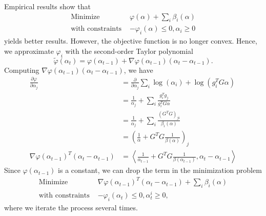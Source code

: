 \documentclass{article}
\renewcommand{\|}{\biggr|}
\begin{document}
    Empirical results show that
    \begin{align*}
    \text{Minimize } & \varphi(\alpha) + \sum_i \beta_i(\alpha) \\
    \text{with constraints } & -\varphi_i(\alpha) \leq 0, \alpha_i \geq 0
    \end{align*}
    yields better results. However, the objective function is no longer convex. Hence, we approximate $\varphi_i$ with the second-order Taylor polynomial
    \begin{equation*}
    \tilde{\varphi}(\alpha_t) = \varphi(\alpha_{t-1}) + \nabla \varphi(\alpha_{t-1})(\alpha_t - \alpha_{t-1}).
    \end{equation*}
    Computing $\nabla \varphi(\alpha_{t-1})(\alpha_t - \alpha_{t-1})$, we have
    \begin{align*}
    \frac{\partial \varphi}{\partial \alpha_j} &= \frac{\partial}{\partial \alpha_j} \sum_i \log(\alpha_i) + \log(g_i^T G \alpha) \\
    &= \frac{1}{\alpha_j} + \sum_i \frac{g_i^T g_j}{g_i^T G \alpha} \\
    &= \frac{1}{\alpha_j} + \sum_i \frac{(G^T G)_{ji}}{\beta_i(\alpha)} \\
    &= \left( \frac{1}{\alpha} + G^T G \frac{1}{\beta(\alpha)} \right)_j \\
    \nabla \varphi(\alpha_{t-1})^T (\alpha_t - \alpha_{t-1}) &= \left\langle \frac{1}{\alpha_{t-1}} + G^T G \frac{1}{\beta(\alpha_{t-1})}, \alpha_t - \alpha_{t-1} \right\rangle
    \end{align*}
    Since $\varphi(\alpha_{t-1})$ is a constant, we can drop the term in the minimization problem
    \begin{align*}
    \text{Minimize } & \nabla \varphi(\alpha_{t-1})^T (\alpha_t - \alpha_{t-1}) + \sum_i \beta_i(\alpha) \\
    \text{with constraints } & -\varphi_i(\alpha_t) \leq 0, \alpha_t^i \geq 0,
    \end{align*}
    where we iterate the process several times.
\end{document}
